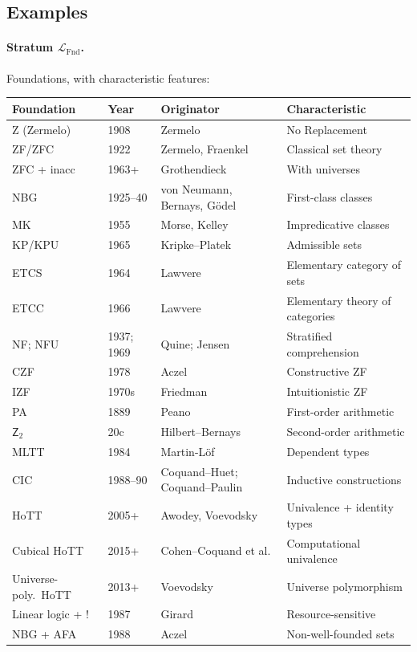\documentclass[11pt]{article}
\theoremstyle{plain}
\theoremstyle{definition}
\newcommand{\LFnd}{\mathcal{L}_{\mathrm{Fnd}}}
\begin{document}
\subsection{Examples}

\paragraph{Stratum $\LFnd$.} Foundations, with characteristic features:

\begin{longtable}{@{}p{3.8cm}l p{4cm} p{4.6cm}@{}}
\toprule
Foundation & Year & Originator & Characteristic \\ \midrule
Z (Zermelo) & 1908 & Zermelo & No Replacement \\
ZF/ZFC & 1922 & Zermelo, Fraenkel & Classical set theory \\
ZFC + inacc & 1963+ & Grothendieck & With universes \\
NBG & 1925--40 & von Neumann, Bernays, G\"odel & First-class classes \\
MK & 1955 & Morse, Kelley & Impredicative classes \\
KP/KPU & 1965 & Kripke--Platek & Admissible sets \\
ETCS & 1964 & Lawvere & Elementary category of sets \\
ETCC & 1966 & Lawvere & Elementary theory of categories \\
NF; NFU & 1937; 1969 & Quine; Jensen & Stratified comprehension \\
CZF & 1978 & Aczel & Constructive ZF \\
IZF & 1970s & Friedman & Intuitionistic ZF \\
PA & 1889 & Peano & First-order arithmetic \\
$\mathsf{Z}_2$ & 20c & Hilbert--Bernays & Second-order arithmetic \\
MLTT & 1984 & Martin-L\"of & Dependent types \\
CIC & 1988--90 & Coquand--Huet; Coquand--Paulin & Inductive constructions \\
HoTT & 2005+ & Awodey, Voevodsky & Univalence + identity types \\
Cubical HoTT & 2015+ & Cohen--Coquand et al. & Computational univalence \\
Universe-poly.\ HoTT & 2013+ & Voevodsky & Universe polymorphism \\
Linear logic + ! & 1987 & Girard & Resource-sensitive \\
NBG + AFA & 1988 & Aczel & Non-well-founded sets \\

\end{longtable}
\end{document}
